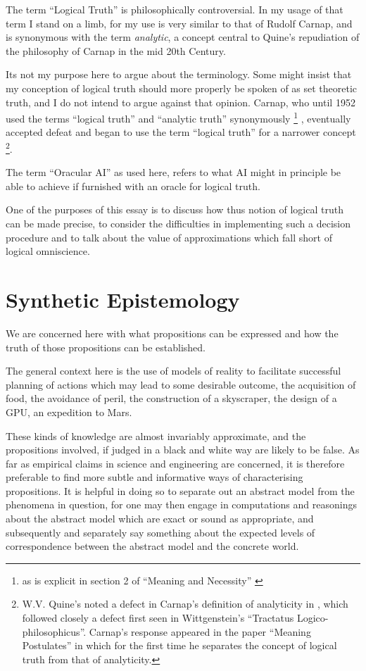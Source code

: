 \documentclass[10pt,titlepage]{book}
\begin{document}
The term ``Logical Truth'' is philosophically controversial.
In my usage of that term I stand on a limb, for my use is very similar to that of Rudolf Carnap, and is synonymous with the term \emph{analytic}, a concept central to Quine's repudiation of the philosophy of Carnap in the mid 20th Century.

Its not my purpose here to argue about the terminology.
Some might insist that my conception of logical truth should more properly be spoken of as set theoretic truth, and I do not intend to argue against that opinion.
Carnap, who until 1952 used the terms ``logical truth'' and ``analytic truth'' synonymously %
\footnote{as is explicit in section 2 of ``Meaning and Necessity'' \cite{carnap56}}%
, eventually accepted defeat and began to use the term ``logical truth'' for a narrower concept%
\footnote{W.V. Quine's noted a defect in Carnap's definition of analyticity in \cite{carnap56}, which followed closely a defect first seen in Wittgenstein's ``Tractatus Logico-philosophicus''\cite{Wittgenstein1921}.
Carnap's response appeared in the paper ``Meaning Postulates''\cite{carnap52} in which for the first time he separates the concept of logical truth from that of analyticity.}.

The term ``Oracular AI'' as used here, refers to what AI might in principle be able to achieve if furnished with an oracle for logical truth.

One of the purposes of this essay is to discuss how thus notion of logical truth can be made precise, to consider the difficulties in implementing such a decision procedure and to talk about the value of approximations which fall short of logical omniscience.

\section{Synthetic Epistemology}

We are concerned here with what propositions can be expressed and how the truth of those propositions can be established.

The general context here is the use of models of reality to facilitate successful planning of actions which may lead to some desirable outcome, the acquisition of food, the avoidance of peril, the construction of a skyscraper, the design of a GPU, an expedition to Mars.

These kinds of knowledge are almost invariably approximate, and the propositions involved, if judged in a black and white way are likely to be false.
As far as empirical claims in science and engineering are concerned, it is therefore preferable to find more subtle and informative ways of characterising propositions.
It is helpful in doing so to separate out an abstract model from the phenomena in question, for one may then engage in computations and reasonings about the abstract model which are exact or sound as appropriate, and subsequently and separately say something about the expected levels of correspondence between the abstract model and the concrete world.
\end{document}
